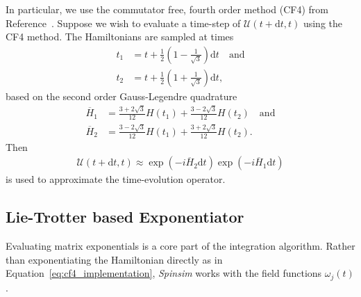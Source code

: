 \documentclass{jors}
\begin{document}
		In particular, we use the commutator free, fourth order method (CF4) from Reference~\cite{auer_magnus_2018}.
		Suppose we wish to evaluate a time-step of $ \mathcal{U}(t + \mathrm{d}t, t) $ using the CF4 method.
		The Hamiltonians are sampled at times
		\begin{align}
			t_1 &= t + \frac12 \left(1 - \frac{1}{\sqrt{3}}\right)\mathrm{d}t\quad\text{and}\\
			t_2 &= t + \frac12 \left(1 + \frac{1}{\sqrt{3}}\right)\mathrm{d}t,
		\end{align} %
		based on the second order Gauss-Legendre quadrature
		\begin{align}
			\overline{H}_1 &= \frac{3 + 2\sqrt{3}}{12}H(t_1) + \frac{3 - 2\sqrt{3}}{12}H(t_2)\quad\text{and}\label{eq:cf4_sample_1}\\
			\overline{H}_2 &= \frac{3 - 2\sqrt{3}}{12}H(t_1) + \frac{3 + 2\sqrt{3}}{12}H(t_2).\label{eq:cf4_sample_2}
		\end{align}
		Then
		\begin{align}
			\mathcal{U}(t + \mathrm{d}t, t) \approx \exp(-i\overline{H}_2\mathrm{d}t)\exp(-i\overline{H}_1\mathrm{d}t)\label{eq:cf4_implementation}
		\end{align}%
		is used to approximate the time-evolution operator.

	\subsection{Lie-Trotter based Exponentiator}
		Evaluating matrix exponentials is a core part of the integration algorithm.
		Rather than exponentiating the Hamiltonian directly as in Equation~\eqref{eq:cf4_implementation}, \emph{Spinsim} works with the field functions $ \omega_j(t) $.
\end{document}
